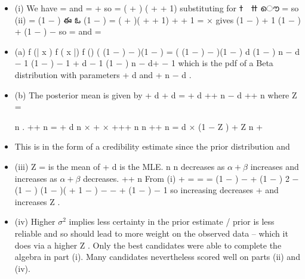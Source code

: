 \documentclass[a4paper,12pt]{article}
\begin{document}
\newpage
\begin{itemize}
\item  (i)
We have \mu =
and
 =
\alpha
\alpha+\beta 
so \beta  =
\alpha{}
( \alpha + \beta  ) ( \alpha + \beta  + 1)
substituting for ߙ ൅ ߚ ൌ
 =
so
(ii)
 =
\alpha (1 − \mu )
\mu
ఈ
ఓ
\beta 
\mu (1 − \mu )
=
( \alpha + \beta  )( \alpha + \beta  + 1) \alpha + \beta  + 1
= \mu ×
gives
\mu (1 − \mu )
\alpha
+ 1
\mu
{} (1 − \mu )
\alpha+\mu
{} (1 − \mu ) − \mu{}
so \alpha =
and \beta  =

\item 
(a) f (\theta| x ) \alpha f ( x |\theta) f (\theta)
(  (1 − \mu ) − \mu{} )(1 − \mu )
\mu{}
=
( \mu (1 − \mu ) −  )(1 − \mu )
\alpha \theta d (1 − \theta) n − d \theta \alpha− 1 (1 − \theta) \beta − 1
\alpha \theta \alpha + d − 1 (1 − \theta) n − d+ \beta − 1
which is the pdf of a Beta distribution with parameters \alpha + d and
\beta  + n − d .
\item  (b)
The posterior mean is given by
\alpha+ d
\alpha+ d
=
\alpha + d +\beta + n − d
\alpha +\beta + n
where Z =

n
.
\alpha +\beta + n
= \alpha
\alpha+\beta 
d
n
×
+ ×
\alpha +\beta  \alpha +\beta + n n \alpha +\beta + n
= \alpha
d
× (1 − Z ) + Z
n
\alpha +\beta %
\item This is in the form of a credibility estimate since
the prior distribution and
\item  (iii)
Z =
\alpha
is the mean of
\alpha+\beta 
d
is the MLE.
n
n
decreases as $\alpha + \beta$  increases and increases as $\alpha + \beta$  decreases.
\alpha +\beta + n
From (i) \alpha + \beta  =
=
=
 (1 − \mu ) − \mu{} + \mu (1 − \mu ) 2 − (1 − \mu ) 
\mu (1 − \mu )( \mu + 1 − \mu ) − \mu{} −  + \mu{}
\mu (1 − \mu )
− 1
so increasing  decreases \alpha + \beta  and increases Z .
\item (iv)
Higher $\sigma^2$ implies less certainty in the prior estimate / prior is less reliable and
so should lead to more weight on the observed data – which it does via a
higher Z .
Only the best candidates were able to complete the algebra in part (i). Many candidates
nevertheless scored well on parts (ii) and (iv).
\end{itemize}
\end{document}
